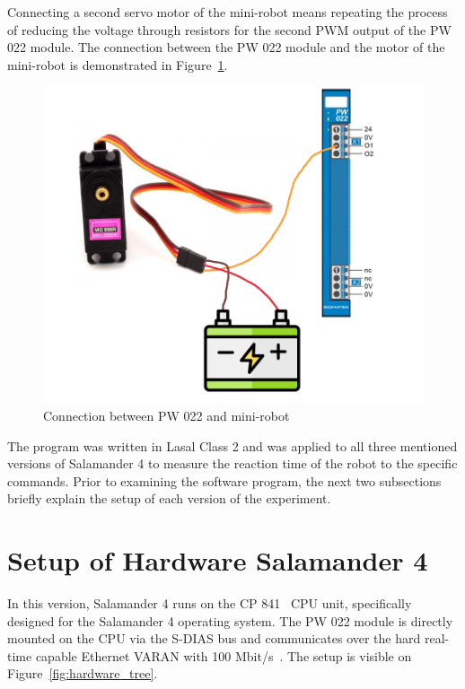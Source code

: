 \documentclass[MMR,Master,english]{twbook}
\begin{document}
\noindent Connecting a second servo motor of the mini-robot means repeating the process of reducing the voltage through resistors for the second PWM output of the PW 022 module. The connection between the PW 022 module and the motor of the mini-robot is demonstrated in Figure~\ref{fig:pw022_minirobot_connection}.

\begin{figure}[H]
	\centering
	\includegraphics[width=0.7\columnwidth]{img/experiment/pw022_minirobot.png}
	\caption[Connection between PW 022 and mini-robot]{Connection between PW 022 and mini-robot~\cite{MG996RDigitalServo}}
	\label{fig:pw022_minirobot_connection}
\end{figure}

\noindent The program was written in Lasal Class 2 and was applied to all three mentioned versions of Salamander 4 to measure the reaction time of the robot to the specific commands. Prior to examining the software program, the next two subsections briefly explain the setup of each version of the experiment.

\section{Setup of Hardware Salamander 4}
In this version, Salamander 4 runs on the CP 841~\cite{CPUEinheitenSIGMATEK} CPU unit, specifically designed for the Salamander 4 operating system. The PW 022 module is directly mounted on the CPU via the S-DIAS bus and communicates over the hard real-time capable Ethernet VARAN with 100 Mbit/s~\cite{SDIASSIGMATEK}. The setup is visible on Figure~\ref{fig:hardware_tree}.
\end{document}

